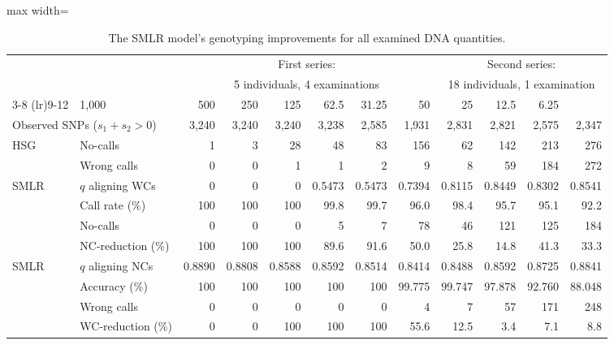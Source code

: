 \begin{table*}
\centering
\caption{The SMLR model's genotyping improvements for all examined DNA quantities.} 
\label{tab:NC_WC}
\vspace{1mm}
\begin{adjustbox}{max width=\textwidth}
\begin{threeparttable}
\begin{tabular}{llrrrrrrrrrr}
  \toprule[2pt]
\null & \null & \multicolumn{6}{c}{First series:} & \multicolumn{4}{c}{Second series:} \\
\null & \null & \multicolumn{6}{c}{5 individuals, 4 examinations} & \multicolumn{4}{c}{18 individuals, 1 examination} \\
\cmidrule(lr){3-8} \cmidrule(lr){9-12}
\multicolumn{2}{l}{DNA quantity (\si{\pg})} & 1,000 & 500 & 250 & 125 & 62.5 & 31.25 & 50 & 25 & 12.5 & 6.25 \\ 
\multicolumn{2}{l}{Observed SNPs ($s_1\!+\!s_2\!>\!0$)} & 3,240 & 3,240 & 3,240 & 3,238 & 2,585 & 1,931 & 2,831 & 2,821 & 2,575 & 2,347 \\ 
\midrule[2pt]
\multirow{2}{*}{HSG\tnote{$*$}} & No-calls & 1 & 3 & 28 & 48 & 83 & 156 & 62 & 142 & 213 & 276 \\ 
   & Wrong calls & 0 & 0 & 1 & 1 & 2 & 9 & 8 & 59 & 184 & 272 \\ 
\midrule[2pt]
\multirow{4}{*}{SMLR\tnote{$\S$}}  & $q$ aligning WCs\tnote{$\dagger$} & 0 & 0 & 0 & 0.5473 & 0.5473 & 0.7394 & 0.8115 & 0.8449 & 0.8302 & 0.8541 \\ 
\cmidrule(lr){2-12}
   & Call rate (\%) & 100 & 100 & 100 & 99.8 & 99.7 & 96.0 & 98.4 & 95.7 & 95.1 & 92.2 \\ 
   & No-calls & 0 & 0 & 0 & 5 & 7 & 78 & 46 & 121 & 125 & 184 \\ 
\cmidrule(lr){2-12}
   & NC-reduction (\%) & 100 & 100 & 100 & 89.6 & 91.6 & 50.0 & 25.8 & 14.8 & 41.3 & 33.3 \\ 
\midrule[2pt]
\multirow{4}{*}{SMLR\tnote{$\S$}} & $q$ aligning NCs\tnote{$\ddagger$} & 0.8890 & 0.8808 & 0.8588 & 0.8592 & 0.8514 & 0.8414 & 0.8488 & 0.8592 & 0.8725 & 0.8841 \\ 
\cmidrule(lr){2-12}
   & Accuracy (\%) & 100 & 100 & 100 & 100 & 100 & 99.775 & 99.747 & 97.878 & 92.760 & 88.048 \\ 
   & Wrong calls & 0 & 0 & 0 & 0 & 0 & 4 & 7 & 57 & 171 & 248 \\ 
\cmidrule(lr){2-12}
   & WC-reduction (\%) & 0 & 0 & 100 & 100 & 100 & 55.6 & 12.5 & 3.4 & 7.1 & 8.8 \\ 

\end{tabular}
\end{threeparttable}
\end{adjustbox}
\end{table*}
